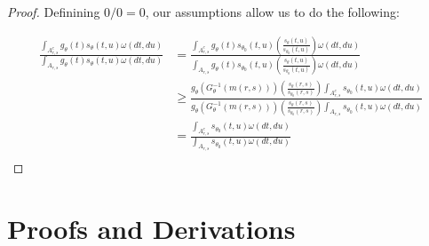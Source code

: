 \documentclass{article}
\begin{document}
\begin{appendix}
\begin{proof}
        Definining $0/0 = 0$, our assumptions allow us to do the following:
        
        \begin{align*}
            \frac{ \int_{A_{r, s}^c} g_{\theta}(t) s_{\theta}(t, u) \omega(dt, du)} { \int_{A_{r, s}}  g_{\theta}(t) s_{\theta}(t, u) \omega(dt, du)} &=\frac{ \int_{A_{r, s}^c} g_{\theta}(t) s_{\theta_0}(t, u) \left( \frac{s_{\theta}(t, u) }{s_{\theta_0}(t, u)} \right) \omega(dt, du)} { \int_{A_{r, s}}  g_{\theta}(t) s_{\theta_0}(t, u) \left( \frac{s_{\theta}(t, u) }{s_{\theta_0}(t, u)} \right) \omega(dt, du)}\\
                &\geq \frac{g_{\theta}(G_{\theta}^{-1}(m(r, s))) \left( \frac{s_{\theta}(r, s) }{s_{\theta_0}(r, s)} \right)   \int_{A_{r, s}^c} s_{\theta_0}(t, u) \omega(dt, du)}{ g_{\theta}(G_{\theta}^{-1}(m(r, s))) \left( \frac{s_{\theta}(r, s) }{s_{\theta_0}(r, s)} \right)  \int_{A_{r, s}} s_{\theta_0}(t, u) \omega(dt, du)}\\
                &= \frac{  \int_{A_{r, s}^c} s_{\theta_0}(t, u) \omega(dt, du)}{   \int_{A_{r, s}} s_{\theta_0}(t, u) \omega(dt, du)}\\
        \end{align*}

\end{proof}

\section{Proofs and Derivations}
\label{sec:proofs_appdx}


\end{appendix}
\end{document}
